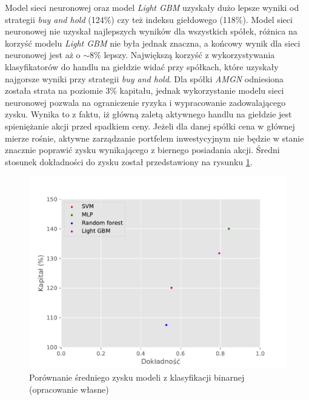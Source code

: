 \documentclass[a4paper, twoside, 11pt, openright]{article}
\begin{document}
Model sieci neuronowej oraz model \textit{Light GBM} uzyskały dużo lepsze wyniki od strategii \textit{buy and hold} (124\%) czy też indeksu giełdowego (118\%). Model sieci neuronowej nie uzyskał najlepszych wyników dla wszystkich spółek, różnica na korzyść modelu \textit{Light GBM} nie była jednak znaczna, a końcowy wynik dla sieci neuronowej jest aż o $\sim 8\%$ lepszy. Największą korzyść z wykorzystywania klasyfikatorów do handlu na giełdzie widać przy spółkach, które uzyskały najgorsze wyniki przy strategii \textit{buy and hold}. Dla spółki \textit{AMGN} odniesiona została strata na poziomie 3\% kapitału, jednak wykorzystanie modelu sieci neuronowej pozwala na ograniczenie ryzyka i wypracowanie zadowalającego zysku. Wynika to z faktu, iż główną zaletą aktywnego handlu na giełdzie jest spieniężanie akcji przed spadkiem ceny. Jeżeli dla danej spółki cena w głównej mierze rośnie, aktywne zarządzanie portfelem inwestycyjnym nie będzie w stanie znacznie poprawić zysku wynikającego z biernego posiadania akcji. Średni stosunek dokładności do zysku został przedstawiony na rysunku \ref{img:summary-binary-gain}. 

\begin{figure}[H]
\centering \includegraphics[scale=0.9]{img/summary-binary-gain-summary.pdf}
\caption{Porównanie średniego zysku modeli z klasyfikacji binarnej (opracowanie własne)}
\label{img:summary-binary-gain}
\end{figure}
\end{document}
